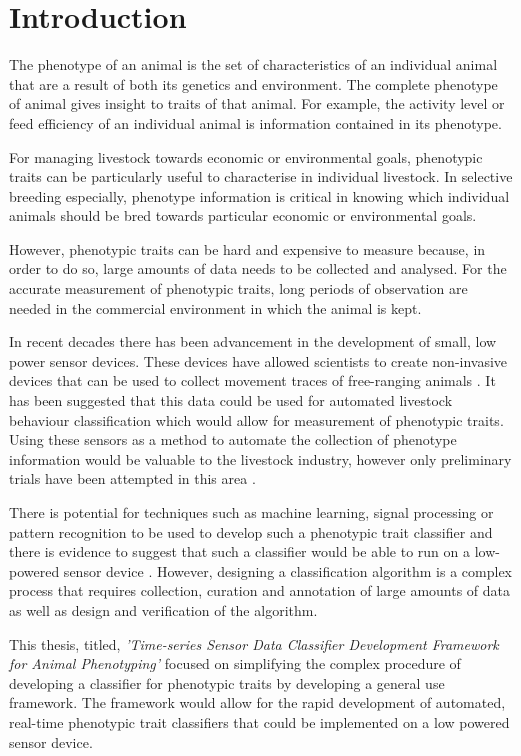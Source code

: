 \chapter{Introduction}

The phenotype of an animal is the set of characteristics of an individual animal that are a result of both its genetics and environment. The complete phenotype of animal gives insight to traits of that animal. For example, the activity level or feed efficiency of an individual animal is information contained in its phenotype. 

For managing livestock towards economic or environmental goals, phenotypic traits can be particularly useful to characterise in individual livestock. In selective breeding especially, phenotype information is critical in knowing which individual animals should be bred towards particular economic or environmental goals. \cite{Pollak2012} \cite{Arthur}

However, phenotypic traits can be hard and expensive to measure because, in order to do so, large amounts of data needs to be collected and analysed. For the accurate measurement of phenotypic traits, long periods of observation are needed in the commercial environment in which the animal is kept. \cite{Falconer1996}

In recent decades there has been advancement in the development of small, low power sensor devices. These devices have allowed scientists to create non-invasive devices that can be used to collect movement traces of free-ranging animals \cite{Anthony2012}. It has been suggested that this data could be used for automated livestock behaviour classification \cite{Guo2006} which would allow for measurement of phenotypic traits. Using these sensors as a method to automate the collection of phenotype information would be valuable to the livestock industry, however only preliminary trials have been attempted in this area \cite{Guo2006}. 

There is potential for techniques such as machine learning, signal processing or pattern recognition to be used to develop such a phenotypic trait classifier \cite{Guo2006} and there is evidence to suggest that such a classifier would be able to run on a low-powered sensor device \cite{predd2007distributed} \cite{stoeltingmachine}. However, designing a classification algorithm is a complex process that requires collection, curation and annotation of large amounts of data as well as design and verification of the algorithm. 

This thesis, titled, \textit{'Time-series Sensor Data Classifier Development Framework for Animal Phenotyping'} focused on simplifying the complex procedure of developing a classifier for phenotypic traits by developing a general use framework. The framework would allow for the rapid development of automated, real-time phenotypic trait classifiers that could be implemented on a low powered sensor device. 

